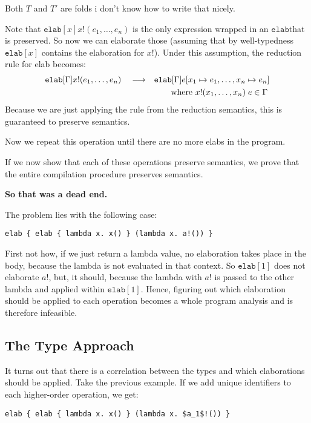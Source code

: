 \documentclass{article}
\newcommand\kw[1]{\ensuremath{\mathbf{\mathtt{#1}}}}
\newcommand\elab{\kw{elab}}
\begin{document}
Both $T$ and $T'$ are folds i don't know how to write that nicely.

Note that $\elab[x]{x!(e_1,\dots,e_n)}$ is the only expression wrapped in an \elab that is preserved. So now we can elaborate those (assuming that by well-typedness $\elab[x]$ contains the elaboration for $x!$). Under this assumption, the reduction rule for elab becomes:
\begin{align*}
    \elab[\Gamma]{x!(e_1, \dots, e_n)} \reduce& \elab[\Gamma]{e[x_1\mapsto e_1, \dots, x_n\mapsto e_n]}\\
    &\qquad\text{where } x!(x_1, \dots, x_n)\;e \in \Gamma
\end{align*}
Because we are just applying the rule from the reduction semantics, this is guaranteed to preserve semantics.

Now we repeat this operation until there are no more elabs in the program.

If we now show that each of these operations preserve semantics, we prove that the entire compilation procedure preserves semantics.

\textbf{So that was a dead end.}

The problem lies with the following case:

\begin{lstlisting}
elab { elab { lambda x. x() } (lambda x. a!()) }
\end{lstlisting}

First not how, if we just return a lambda value, no elaboration takes place in the body, because the lambda is not evaluated in that context. So $\elab[1]{}$ does not elaborate $a!$, but, it should, because the lambda with $a!$ is passed to the other lambda and applied within $\elab[1]{}$. Hence, figuring out which elaboration should be applied to each operation becomes a whole program analysis and is therefore infeasible.

\subsection{The Type Approach}

It turns out that there is a correlation between the types and which elaborations should be applied. Take the previous example. If we add unique identifiers to each higher-order operation, we get:

\begin{lstlisting}
elab { elab { lambda x. x() } (lambda x. $a_1$!()) }
\end{lstlisting}
\end{document}
